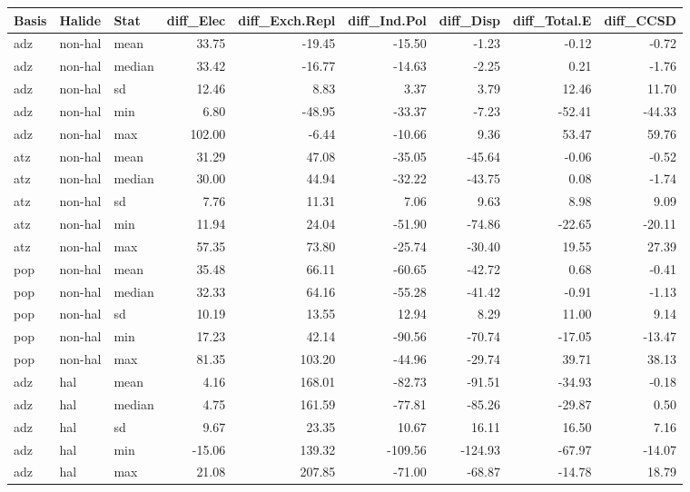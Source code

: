 \begin{table}[ht]
    \label{tab:multiLinEFP}
\centering
\begin{tabular}{lllrrrrrr}
  \hline
Basis & Halide & Stat & diff\_Elec & diff\_Exch.Repl & diff\_Ind.Pol & diff\_Disp & diff\_Total.E & diff\_CCSD \\ 
  \hline
adz & non-hal & mean & 33.75 & -19.45 & -15.50 & -1.23 & -0.12 & -0.72 \\ 
  adz & non-hal & median & 33.42 & -16.77 & -14.63 & -2.25 & 0.21 & -1.76 \\ 
  adz & non-hal & sd & 12.46 & 8.83 & 3.37 & 3.79 & 12.46 & 11.70 \\ 
  adz & non-hal & min & 6.80 & -48.95 & -33.37 & -7.23 & -52.41 & -44.33 \\ 
  adz & non-hal & max & 102.00 & -6.44 & -10.66 & 9.36 & 53.47 & 59.76 \\ 
  atz & non-hal & mean & 31.29 & 47.08 & -35.05 & -45.64 & -0.06 & -0.52 \\ 
  atz & non-hal & median & 30.00 & 44.94 & -32.22 & -43.75 & 0.08 & -1.74 \\ 
  atz & non-hal & sd & 7.76 & 11.31 & 7.06 & 9.63 & 8.98 & 9.09 \\ 
  atz & non-hal & min & 11.94 & 24.04 & -51.90 & -74.86 & -22.65 & -20.11 \\ 
  atz & non-hal & max & 57.35 & 73.80 & -25.74 & -30.40 & 19.55 & 27.39 \\ 
  pop & non-hal & mean & 35.48 & 66.11 & -60.65 & -42.72 & 0.68 & -0.41 \\ 
  pop & non-hal & median & 32.33 & 64.16 & -55.28 & -41.42 & -0.91 & -1.13 \\ 
  pop & non-hal & sd & 10.19 & 13.55 & 12.94 & 8.29 & 11.00 & 9.14 \\ 
  pop & non-hal & min & 17.23 & 42.14 & -90.56 & -70.74 & -17.05 & -13.47 \\ 
  pop & non-hal & max & 81.35 & 103.20 & -44.96 & -29.74 & 39.71 & 38.13 \\ 
  adz & hal & mean & 4.16 & 168.01 & -82.73 & -91.51 & -34.93 & -0.18 \\ 
  adz & hal & median & 4.75 & 161.59 & -77.81 & -85.26 & -29.87 & 0.50 \\ 
  adz & hal & sd & 9.67 & 23.35 & 10.67 & 16.11 & 16.50 & 7.16 \\ 
  adz & hal & min & -15.06 & 139.32 & -109.56 & -124.93 & -67.97 & -14.07 \\ 
  adz & hal & max & 21.08 & 207.85 & -71.00 & -68.87 & -14.78 & 18.79 \\ 

\end{tabular}
\end{table}
